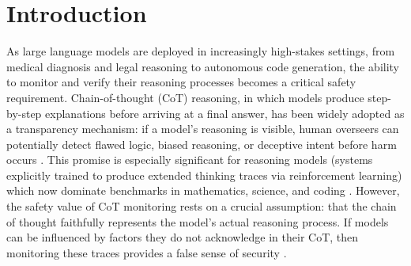 
\section{Introduction}

As large language models are deployed in increasingly high-stakes
settings, from medical diagnosis and legal reasoning to autonomous code
generation, the ability to monitor and verify their reasoning processes becomes
a critical safety requirement. Chain-of-thought (CoT) reasoning, in which models
produce step-by-step explanations before arriving at a final answer, has been
widely adopted as a transparency mechanism: if a model's reasoning is visible,
human overseers can potentially detect flawed logic, biased reasoning, or
deceptive intent before harm occurs \cite{wei2022cot}. This promise is
especially significant for reasoning models (systems explicitly trained to
produce extended thinking traces via reinforcement learning) which now dominate
benchmarks in mathematics, science, and coding \cite{qchen2025longcot,
xu2025large}. However, the safety value of CoT monitoring rests on a crucial
assumption: that the chain of thought faithfully represents the model's actual
reasoning process. If models can be influenced by factors they do not acknowledge
in their CoT, then monitoring these traces provides a false sense of security
\cite{kadavath2022selfknowledge, korbak2025monitorability}.

